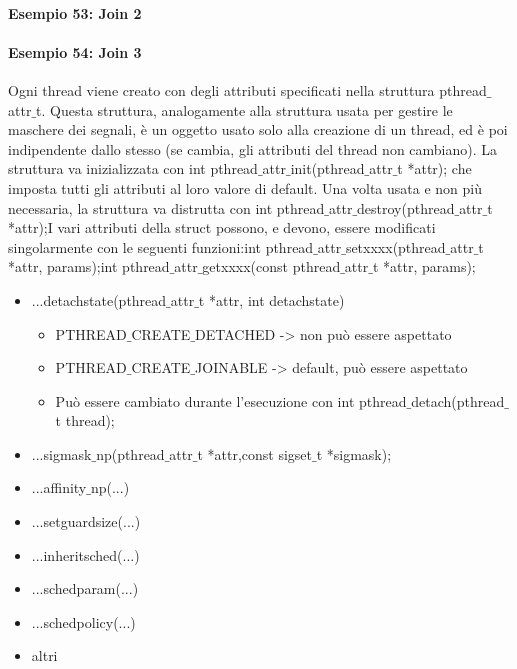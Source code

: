             \paragraph{Esempio 53: Join 2}\hfill \break
            
            \paragraph{Esempio 54: Join 3}\hfill \break
            
        Ogni thread viene creato con degli attributi specificati nella struttura pthread$\_$attr$\_$t. Questa struttura, analogamente alla struttura usata per gestire le maschere dei segnali, è un oggetto usato solo alla creazione di un thread, ed è poi indipendente dallo stesso (se cambia,  gli  attributi  del  thread  non  cambiano).  La  struttura  va  inizializzata  con int  pthread$\_$attr$\_$init(pthread$\_$attr$\_$t  *attr); che  imposta  tutti  gli attributi al loro valore di default. Una volta usata e non più necessaria, la struttura va distrutta con     int pthread$\_$attr$\_$destroy(pthread$\_$attr$\_$t *attr);I vari attributi della struct possono, e devono, essere modificati singolarmente con le seguenti funzioni:int pthread$\_$attr$\_$setxxxx(pthread$\_$attr$\_$t *attr, params);int pthread$\_$attr$\_$getxxxx(const pthread$\_$attr$\_$t *attr, params);
        
        \begin{itemize}
            \item ...detachstate(pthread$\_$attr$\_$t *attr, int detachstate)
                \begin{itemize}
                    \item PTHREAD$\_$CREATE$\_$DETACHED -> non può essere aspettato
                    \item PTHREAD$\_$CREATE$\_$JOINABLE -> default, può essere aspettato
                    \item Può essere cambiato durante l'esecuzione con int pthread$\_$detach(pthread$\_$t thread);
                \end{itemize}
            \item ...sigmask$\_$np(pthread$\_$attr$\_$t *attr,const sigset$\_$t *sigmask);
            \item ...affinity$\_$np(...)
            \item ...setguardsize(...)
            \item ...inheritsched(...)
            \item ...schedparam(...)
            \item ...schedpolicy(...)
            \item altri
        \end{itemize}

